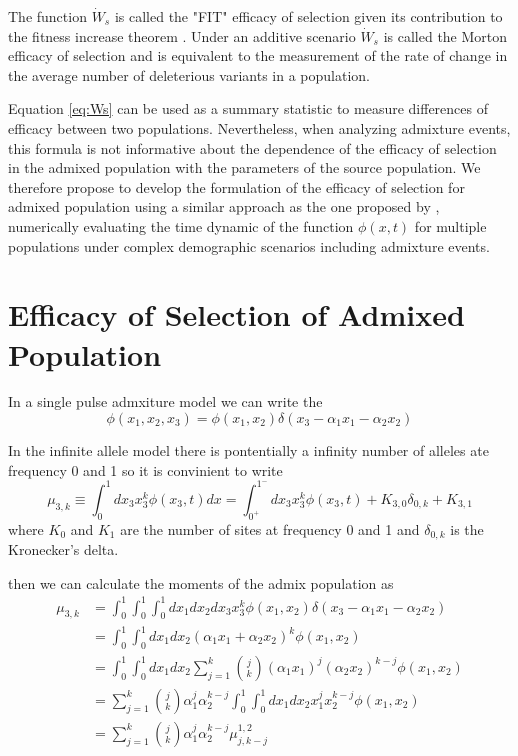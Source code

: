 \documentclass[a4paper, 12pt]{article}
\begin{document}
The function $\dot W_s$ is called the "FIT" efficacy of selection given its
contribution to  the fitness increase theorem \citep{Gravel2016,Ewens2004}.
Under an additive  scenario  $\dot W_s$ is called the Morton efficacy
of selection and is equivalent to the measurement of the rate of change in the
average number of deleterious variants in a population.  

Equation \eqref{eq:Ws} can be used as a summary statistic to measure
differences of efficacy between two populations.  Nevertheless, when analyzing
admixture events, this formula is not informative about the dependence of the
efficacy of selection in the admixed population with the parameters of the
source population. We therefore propose to develop the formulation of the
efficacy of selection for admixed population using a similar approach as the
one proposed by \cite{Jouganous2017}, numerically evaluating the time dynamic
of the function $\phi(x,t)$ for multiple populations under complex demographic
scenarios including admixture events.  

\section{Efficacy of Selection of Admixed Population}%
\label{sec:ef_admix} 

In a single pulse admxiture model we can write the 
\[
  \phi(x_1, x_2, x_3) = 
  \phi(x_1, x_2) \delta(x_3 - \alpha_1 x_1 - \alpha_2 x_2) 
\] 

In the infinite allele model there is pontentially a infinity number of alleles
ate frequency 0 and 1 so it is convinient to write 
\[
\mu_{3,k} \equiv \int_{0}^{1}dx_3 x_3^k \phi(x_3,t)dx 
= \int_{0^+}^{1^-}dx_3 x_3^k \phi(x_3,t) + K_{3,0} \delta_{0,k} + K_{3,1}
\]
where $K_0$ and $K_1$ are the number of sites at frequency 0 and 1 and 
$\delta_{0,k}$ is the Kronecker's delta. 


then we can calculate the moments of the admix population as
\begin{align}
  \mu_{3,k} &= \int_0^1 \int_0^1\int_0^1dx_1 dx_2 dx_3 x_3^k \phi(x_1, x_2) 
  \delta(x_3 - \alpha_1 x_1 - \alpha_2 x_2)
  \nonumber \\
  &= \int_0^1 \int_0^1dx_1 dx_2 (\alpha_1 x_1 +  \alpha_2 x_2) ^k \phi(x_1, x_2)
  \nonumber \\
  &= \int_0^1 \int_0^1dx_1 dx_2 \sum_{j=1}^k\binom{j}{k}
  (\alpha_1 x_1)^j(\alpha_2x_2)^{k -j} \phi(x_1, x_2)
  \nonumber \\
  &= \sum_{j=1}^k\binom{j}{k} \alpha_1^j\alpha_2^{k -j} 
  \int_0^1 \int_0^1dx_1 dx_2 x_1^jx_2^{k -j} \phi(x_1, x_2)
  \nonumber \\
  &= \sum_{j=1}^k\binom{j}{k} \alpha_1^j\alpha_2^{k -j} 
  \mu_{j,k-j}^{1,2}
\end{align}
\end{document}
